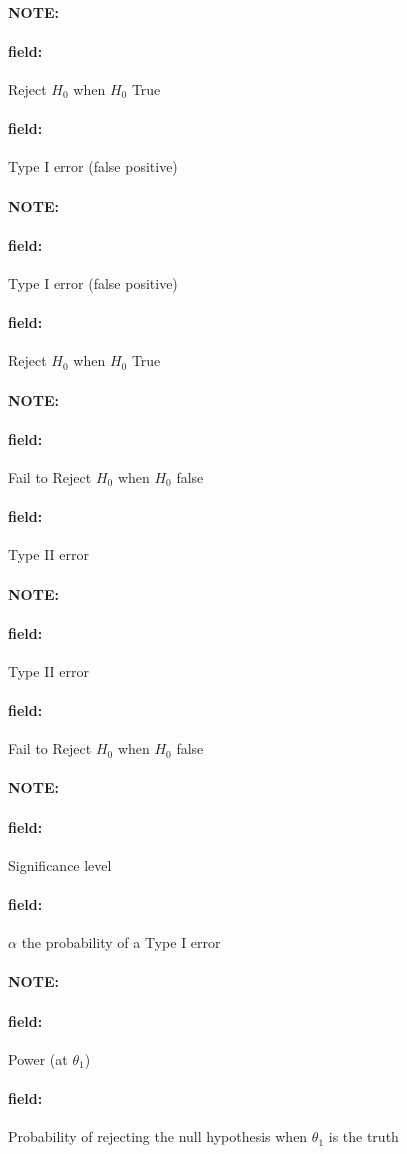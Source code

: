 \documentclass[12pt]{article}
\newenvironment{note}{\paragraph{NOTE:}}{}
\newenvironment{field}{\paragraph{field:}}{}
\begin{document}
\begin{note}
	\begin{field}
		Reject $H_0$ when $H_0$ True
	\end{field}
	\begin{field}
		Type I error (false positive)
	\end{field}
\end{note}

\begin{note}
	\begin{field}
		Type I error (false positive)
	\end{field}
	\begin{field}
		Reject $H_0$ when $H_0$ True
	\end{field}
\end{note}

\begin{note}
	\begin{field}
		Fail to Reject $H_0$ when $H_0$ false
	\end{field}
	\begin{field}
		Type II error
	\end{field}
\end{note}

\begin{note}
	\begin{field}
		Type II error
	\end{field}
	\begin{field}
		Fail to Reject $H_0$ when $H_0$ false
	\end{field}
\end{note}

\begin{note}
	\begin{field}
		Significance level
	\end{field}
	\begin{field}
		$\alpha$ the probability of a Type I error
	\end{field}
\end{note}

\begin{note}
	\begin{field}
		Power (at $\theta_1$)
	\end{field}
	\begin{field}
		Probability of rejecting the null hypothesis when $\theta_1$ is the truth
	\end{field}
\end{note}
\end{document}
